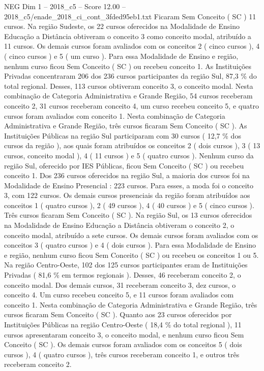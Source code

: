 \begin{textsample}{NEG Dim 1 – 2018\_c5 – Score 12.00 – 2018\_c5/enade\_2018\_ci\_cont\_3fded95eb1.txt}
Ficaram Sem Conceito ( SC ) 11 cursos.
Na região Sudeste, os 22 cursos oferecidos na Modalidade de Ensino Educação a Distância obtiveram o conceito 3 como conceito modal, atribuído a 11 cursos.
Os demais cursos foram avaliados com os conceitos 2 ( cinco cursos ), 4 ( cinco cursos ) e 5 ( um curso ).
Para essa Modalidade de Ensino e região, nenhum curso ficou Sem Conceito ( SC ) ou recebeu conceito 1.
As Instituições Privadas concentraram 206 dos 236 cursos participantes da região Sul, 87,3 \% do total regional.
Desses, 113 cursos obtiveram conceito 3, o conceito modal.
Nesta combinação de Categoria Administrativa e Grande Região, 54 cursos receberam conceito 2, 31 cursos receberam conceito 4, um curso recebeu conceito 5, e quatro cursos foram avaliados com conceito 1.
Nesta combinação de Categoria Administrativa e Grande Região, três cursos ficaram Sem Conceito ( SC ).
As Instituições Públicas na região Sul participaram com 30 cursos ( 12,7 \% dos cursos da região ), aos quais foram atribuídos os conceitos 2 ( dois cursos ), 3 ( 13 cursos, conceito modal ), 4 ( 11 cursos ) e 5 ( quatro cursos ).
Nenhum curso da região Sul, oferecido por IES Públicas, ficou Sem Conceito ( SC ) ou recebeu conceito 1.
Dos 236 cursos oferecidos na região Sul, a maioria dos cursos foi na Modalidade de Ensino Presencial : 223 cursos.
Para esses, a moda foi o conceito 3, com 122 cursos.
Os demais cursos presenciais da região foram atribuídos aos conceitos 1 ( quatro cursos ), 2 ( 49 cursos ), 4 ( 40 cursos ) e 5 ( cinco cursos ).
Três cursos ficaram Sem Conceito ( SC ).
Na região Sul, os 13 cursos oferecidos na Modalidade de Ensino Educação a Distância obtiveram o conceito 2, o conceito modal, atribuído a sete cursos.
Os demais cursos foram avaliados com os conceitos 3 ( quatro cursos ) e 4 ( dois cursos ).
Para essa Modalidade de Ensino e região, nenhum curso ficou Sem Conceito ( SC ) ou recebeu os conceitos 1 ou 5.
Na região Centro-Oeste, 102 dos 125 cursos participantes eram de Instituições Privadas ( 81,6 \% em termos regionais ).
Desses, 46 receberam conceito 2, o conceito modal.
Dos demais cursos, 31 receberam conceito 3, dez cursos, o conceito 4.
Um curso recebeu conceito 5, e 11 cursos foram avaliados com conceito 1.
Nesta combinação de Categoria Administrativa e Grande Região, três cursos ficaram Sem Conceito ( SC ).
Quanto aos 23 cursos oferecidos por Instituições Públicas na região Centro-Oeste ( 18,4 \% do total regional ), 11 cursos apresentaram conceito 3, o conceito modal, e nenhum curso ficou Sem Conceito ( SC ).
Os demais cursos foram avaliados com os conceitos 5 ( dois cursos ), 4 ( quatro cursos ), três cursos receberam conceito 1, e outros três receberam conceito 2.

\end{textsample}
